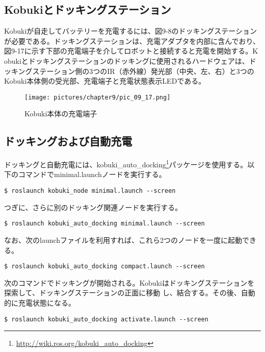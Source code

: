   \subsection{Kobukiとドッキングステーション}

Kobukiが自走してバッテリーを充電するには、図9-8のドッキングステーションが必要である。ドッキングステーションは、充電アダプタを内部に含んでおり、図9-17に示す下部の充電端子を介してロボットと接続すると充電を開始する。K obukiとドッキングステーションのドッキングに使用されるハードウェアは、ドッキングステーション側の3つのIR（赤外線）発光部（中央、左、右）と3つのKobuki本体側の受光部、充電端子と充電状態表示LEDである。

\begin{figure}[htp]
  \centering
  \texttt{[image: pictures/chapter9/pic\_09\_17.png]}
  \caption{Kobuki本体の充電端子}
\end{figure}

\subsection{ドッキングおよび自動充電}

ドッキングと自動充電には、kobuki\_auto\_docking\footnote{\url{http://wiki.ros.org/kobuki\_auto\_docking}}パッケージを使用する。以下のコマンドでminimal.launchノードを実行する。

\begin{lstlisting}[language=ROS]
$ roslaunch kobuki_node minimal.launch --screen
\end{lstlisting}

つぎに、さらに別のドッキング関連ノードを実行する。

\begin{lstlisting}[language=ROS]
$ roslaunch kobuki_auto_docking minimal.launch --screen
\end{lstlisting}

なお、次のlaunchファイルを利用すれば、これら2つのノードを一度に起動できる。

\begin{lstlisting}[language=ROS]
$ roslaunch kobuki_auto_docking compact.launch --screen
\end{lstlisting}

次のコマンドでドッキングが開始される。Kobukiはドッキングステーションを探索して、ドッキングステーションの正面に移動  し、結合する。その後、自動的に充電状態になる。

\begin{lstlisting}[language=ROS]
$ roslaunch kobuki_auto_docking activate.launch --screen
\end{lstlisting}

